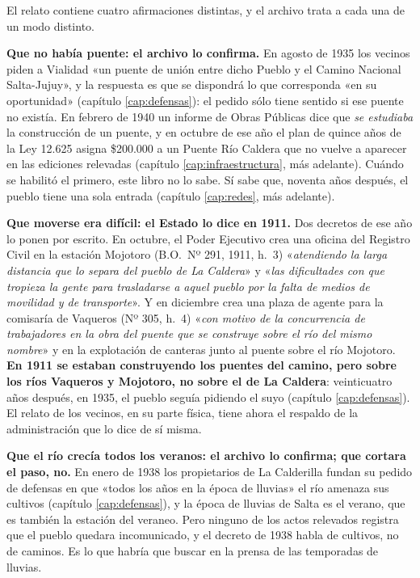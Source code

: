 El relato contiene cuatro afirmaciones distintas, y el archivo trata a cada una de un modo
distinto.

\textbf{Que no había puente: el archivo lo confirma.} En agosto de 1935 los vecinos piden a
Vialidad «un puente de unión entre dicho Pueblo y el Camino Nacional Salta-Jujuy», y la
respuesta es que se dispondrá lo que corresponda «en su oportunidad» (capítulo
\ref{cap:defensas}): el pedido sólo tiene sentido si ese puente no existía. En febrero de 1940
un informe de Obras Públicas dice que \textit{se estudiaba} la construcción de un puente, y en
octubre de ese año el plan de quince años de la Ley 12.625 asigna \$200.000 a un Puente Río
Caldera que no vuelve a aparecer en las ediciones relevadas (capítulo
\ref{cap:infraestructura}, más adelante). Cuándo se habilitó el primero, este libro no lo sabe. Sí sabe que,
noventa años después, el pueblo tiene una sola entrada (capítulo \ref{cap:redes}, más adelante).

\textbf{Que moverse era difícil: el Estado lo dice en 1911.} Dos decretos de ese año lo ponen
por escrito. En octubre, el Poder Ejecutivo crea una oficina del Registro Civil en la estación
Mojotoro (B.O.\ Nº 291, 1911, h.\ 3) «\textit{atendiendo la larga distancia que lo separa del pueblo de La Caldera}» y
«\textit{las dificultades con que tropieza la gente para trasladarse a aquel pueblo por la falta
de medios de movilidad y de transporte}». Y en diciembre crea una plaza de agente para la
comisaría de Vaqueros (Nº 305, h.\ 4) «\textit{con motivo de la concurrencia de trabajadores en la obra del
puente que se construye sobre el río del mismo nombre}» y en la explotación de canteras junto al
puente sobre el río Mojotoro. \textbf{En 1911 se estaban construyendo los puentes del camino,
pero sobre los ríos Vaqueros y Mojotoro, no sobre el de La Caldera}: veinticuatro años después,
en 1935, el pueblo seguía pidiendo el suyo (capítulo \ref{cap:defensas}). El relato de los
vecinos, en su parte física, tiene ahora el respaldo de la administración que lo dice de sí
misma.

\textbf{Que el río crecía todos los veranos: el archivo lo confirma; que cortara el paso, no.}
En enero de 1938 los propietarios de La Calderilla fundan su pedido de defensas en que
«todos los años en la época de lluvias» el río amenaza sus cultivos (capítulo
\ref{cap:defensas}), y la época de lluvias de Salta es el verano, que es también la estación del
veraneo. Pero ninguno de los actos relevados registra que el pueblo quedara incomunicado, y
el decreto de 1938 habla de cultivos, no de caminos. Es lo que habría que buscar en la prensa de
las temporadas de lluvias. 

